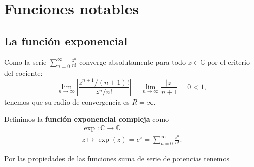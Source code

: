 \section{Funciones notables}

\subsection{La función exponencial}

Como la serie $\sum_{n=0}^\infty \frac{z^n}{n!}$ converge absolutamente para todo \(z\in\mathbb{C}\) por el criterio del cociente:
\[
\lim_{n\to\infty} \left|\frac{z^{n+1}/(n+1)!}{z^n/n!}\right| = \lim_{n\to\infty} \frac{|z|}{n+1} = 0 < 1,
\]
tenemos que su radio de convergencia es \(R=\infty\). 

\begin{definición} 
Definimos la \textbf{función exponencial compleja} como
\[
\begin{matrix}
\exp: \mathbb{C} \to \mathbb{C} \\
     z \mapsto \exp(z) = e^z = \sum_{n=0}^\infty \frac{z^n}{n!}.
\end{matrix}
\]    
\end{definición}


Por las propiedades de las funciones suma de serie de potencias tenemos 

